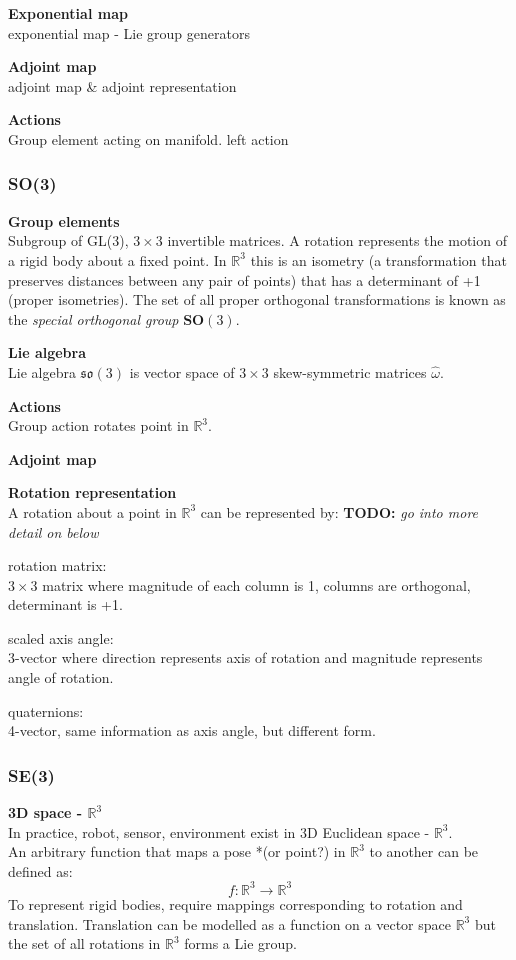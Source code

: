 		\textbf{Exponential map}\\		
		exponential map - Lie group generators
			
		\textbf{Adjoint map}\\			
		adjoint map \& adjoint representation
		
		\textbf{Actions}\\
		Group element acting on manifold.
		left action
		
		
	\subsubsection{\textbf{SO}(3)}
		\textbf{Group elements}\\
		Subgroup of GL(3), $3 \times 3$ invertible matrices.
		A rotation represents the motion of a rigid body about a fixed point. In $\mathbb{R}^3$ this is an isometry (a transformation that preserves distances between any pair of points) that has a determinant of +1 (proper isometries). The set of all proper orthogonal transformations is known as the \textit{special orthogonal group} $\textbf{SO}(3)$.
		
		\textbf{Lie algebra}\\
		Lie algebra $\mathfrak{so}(3)$ is vector space of $3 \times 3$ skew-symmetric matrices $\hat{\omega}$.
		
		\textbf{Actions}\\
		Group action rotates point in $\mathbb{R}^3$.
		
		\textbf{Adjoint map}
		
		\textbf{Rotation representation}\\		
		A rotation about a point in $\mathbb{R}^3$ can be represented by: \textbf{TODO:} \textit{go into more detail on below}
		
		rotation matrix:\\
		$3 \times 3$ matrix where magnitude of each column is 1, columns are orthogonal, determinant is +1.
		
		scaled axis angle:\\
		3-vector where direction represents axis of rotation and magnitude represents angle of rotation.		
		
		quaternions:\\
		4-vector, same information as axis angle, but different form.
		
	\subsubsection{\textbf{SE}(3)}		
		\textbf{3D space - $\mathbb{R}^3$}\\
		In practice, robot, sensor, environment exist in 3D Euclidean space - $\mathbb{R}^3$.\\
		An arbitrary function that maps a pose *(or point?) in $\mathbb{R}^3$ to another can be defined as:
		\begin{equation}
		f: \mathbb{R}^3 \rightarrow \mathbb{R}^3
		\end{equation}
		To represent rigid bodies, require mappings corresponding to rotation and translation. Translation can be modelled as a function on a vector space $\mathbb{R}^3$ but the set of all rotations in $\mathbb{R}^3$ forms a Lie group. 

